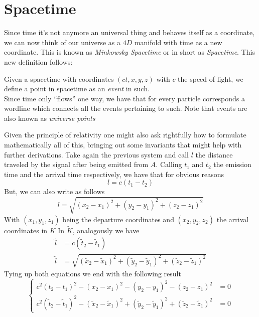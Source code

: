 \documentclass[../admech.tex]{subfiles}
\begin{document}
\section{Spacetime}
Since time it's not anymore an universal thing and behaves itself as a coordinate, we can now think of our universe as a $4D$ manifold with time as a new coordinate. This is known as \emph{Minkowsky Spacetime} or in short as \emph{Spacetime}. This new definition follows:
\begin{dfn}[Event]
	Given a spacetime with coordinates $(ct,x,y,z)$ with $c$ the speed of light, we define a point in spacetime as an \emph{event} in such.\\
	Since time only ``flows'' one way, we have that for every particle corresponds a wordline which connects all the events pertaining to such. Note that events are also known as \emph{universe points}
\end{dfn}
Given the principle of relativity one might also ask rightfully how to formulate mathematically all of this, bringing out some invariants that might help with further derivations. Take again the previous system and call $l$ the distance traveled by the signal after being emitted from $A$. Calling $t_1$ and $t_2$ the emission time and the arrival time respectively, we have that for obvious reasons
\begin{equation}
	l=c(t_1-t_2)
	\label{eq:ltrd1}
\end{equation}
But, we can also write as follows
\begin{equation}
	l=\sqrt{(x_2-x_1)^2+(y_2-y_1)^2+(z_2-z_1)^2}
	\label{eq:ltrd2}
\end{equation}
With $(x_1,y_1,z_1)$ being the departure coordinates and $(x_2,y_2,z_2)$ the arrival coordinates in $K$
In $\tilde{K}$, analogously we have
\begin{equation}
	\begin{aligned}
		\tilde{l}&=c(\tilde{t}_2-\tilde{t}_1)\\
		\tilde{l}&=\sqrt{(\tilde{x}_2-\tilde{x}_1)^2+(\tilde{y}_2-\tilde{y}_1)^2+(\tilde{z}_2-\tilde{z}_1)^2}
	\end{aligned}
	\label{eq:ltrdtil}
\end{equation}
Tying up both equations we end with the following result
\begin{equation}
	\left\{\begin{aligned}
		c^2(t_2-t_1)^2-(x_2-x_1)^2-(y_2-y_1)^2-(z_2-z_1)^2&=0\\
		c^2(\tilde{t}_2-\tilde{t}_1)^2-(\tilde{x}_2-\tilde{x}_1)^2+(\tilde{y}_2-\tilde{y}_1)^2+(\tilde{z}_2-\tilde{z}_1)^2&=0
	\end{aligned}\right.
	\label{eq:interval1}
\end{equation}
\end{document}
